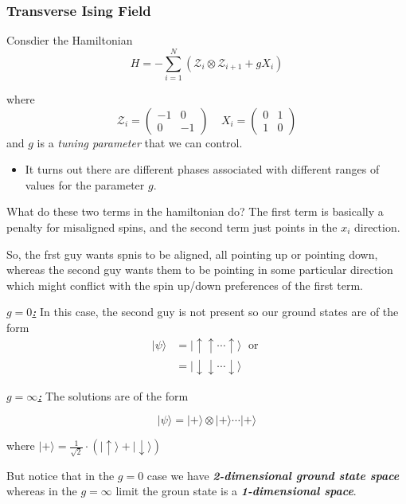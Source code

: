 \documentclass{article}
\newcommand{\ket}[1]{|#1 \rangle}
\begin{document}
\subsubsection*{Transverse Ising Field}

Consdier the Hamiltonian 
\[ H = - \sum_{i = 1}^{N}  \left(\mathcal{Z}_{i} \otimes \mathcal{Z}_{i+1} + gX_i\right) \]

where 
\[ \mathcal{Z}_{i} = \begin{pmatrix}
  -1 & 0 \\
  0 & -1
\end{pmatrix}\;\;\;\; X_i= \begin{pmatrix}
  0 & 1 \\
  1 & 0
\end{pmatrix} \]
and $g$ is a \emph{tuning parameter} that we can control.

\begin{itemize}
  \item It turns out there are different phases associated with different ranges of values for the parameter $g$.
\end{itemize}

What do these two terms in the hamiltonian do?
The first term is basically a penalty for misaligned spins, and the second term just points in the $x_i$ direction.

\vskip 0.25cm
So, the frst guy wants spnis to be aligned, all pointing up or pointing down, whereas the second guy wants them to be pointing in some particular direction which might conflict with the spin up/down preferences of the first term.

\vskip 0.5cm
\underline{\textbf{\emph{$g = 0$:}}} In this case, the second guy is not present so our ground states are of the form 
\begin{align*}
  \ket{\psi} &= \ket{ \uparrow \uparrow \cdots \uparrow } \;\text{  or  } \\
  &= \ket{ \downarrow \downarrow \cdots \downarrow }
\end{align*}

\vskip 0.25cm
\underline{\textbf{\emph{$g = \infty$:}}} The solutions are of the form 

\[ \ket{\psi} = \ket{+} \otimes \ket{+} \cdots \ket{+} \]

where $\ket{+} = \frac{1}{\sqrt{2}} \cdot \left( \ket{\uparrow} + \ket{\downarrow} \right)$

\vskip 0.25cm
But notice that in the $g = 0$ case we have \emph{\textbf{2-dimensional ground state space}} whereas in the $g = \infty$ limit the groun state is a \emph{\textbf{1-dimensional space}}.
\end{document}

